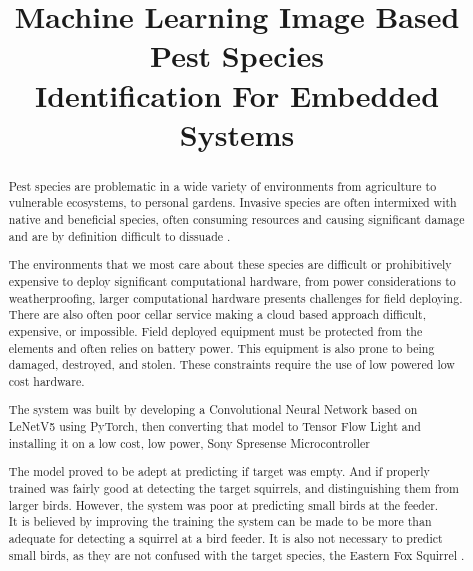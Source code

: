 \documentclass[conference]{IEEEtran}
\begin{document}
\title{	Machine Learning Image Based Pest Species\\Identification For Embedded Systems}

\author{


}

\maketitle

\begin{abstract}
	Pest species are problematic in a wide variety of environments from agriculture to vulnerable ecosystems, to personal gardens. Invasive species are often intermixed with native and beneficial species, often consuming resources and causing significant damage \cite{Paini}\cite{Anderies} and are by definition difficult to dissuade \cite{Koehler}.

	The environments that we most care about these species are  difficult or prohibitively expensive to deploy significant computational hardware, from power considerations to weatherproofing, larger computational hardware presents challenges for field deploying. There are also often poor cellar service making a cloud based approach difficult, expensive, or impossible. Field deployed equipment must be protected from the elements and often relies on battery power. This equipment is also prone to being damaged, destroyed, and stolen. These constraints require the use of low powered low cost hardware. 

The system was built by developing a Convolutional Neural Network based on LeNetV5 using PyTorch, then converting that model to Tensor Flow Light and installing it on a low cost, low power, Sony Spresense Microcontroller \cite{sony}

The model proved to be  adept at predicting if target was empty. And if properly trained  was fairly good at detecting the target squirrels, and distinguishing them from larger birds. However, the system was poor at predicting small birds at the feeder. \\
It is believed by improving the training the system can be made to be more than adequate for detecting a squirrel at a bird feeder. It is also not necessary to predict small birds, as they are not confused with the target species, the Eastern Fox Squirrel \cite{krause}.
\end{abstract}
\end{document}
